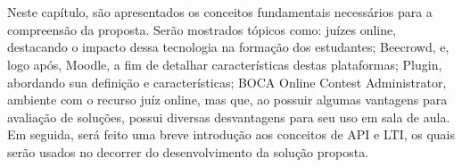 

\chapter{}

Neste capítulo, são apresentados os conceitos fundamentais necessários para a compreensão da proposta. Serão mostrados tópicos como: juízes online, destacando o impacto dessa tecnologia na formação dos estudantes; Beecrowd, e, logo após, Moodle, a fim de detalhar características destas plataformas; Plugin, abordando sua definição e características; BOCA Online Contest Administrator, ambiente com o recurso juíz online, mas que, ao possuir algumas vantagens para avaliação de soluções, possui diversas desvantagens para seu uso em sala de aula. Em seguida, será feito uma breve introdução aos conceitos de API e LTI, os quais serão usados no decorrer do desenvolvimento da solução proposta.

